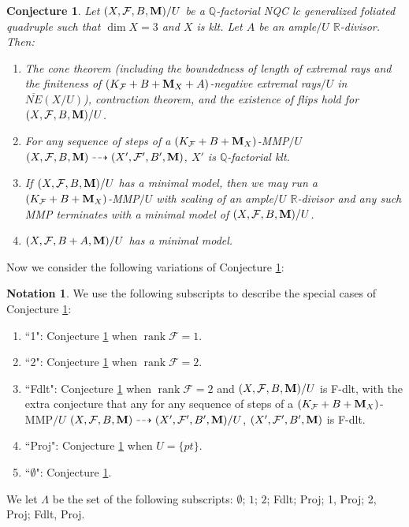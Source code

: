 \documentclass[11pt]{amsart}
\numberwithin{equation}{section}
\newcommand{\Mm}{{\bf{M}}}
\newcommand{\Qq}{\mathbb{Q}}
\newcommand{\Rr}{\mathbb{R}}
\newcommand{\rk}{\operatorname{rank}}
\newcommand{\Ff}{\mathcal{F}}
\newtheorem{conj}[thm]{Conjecture}
\theoremstyle{definition}
\theoremstyle{definition}
\newtheorem{nota}[thm]{Notation}
\theoremstyle{definition}
\begin{document}
\begin{conj}\label{conj: mmp gfq threefold}
    Let $(X,\Ff,B,\Mm)/U$ be a $\Qq$-factorial NQC lc generalized foliated quadruple such that $\dim X=3$ and $X$ is klt. Let $A$ be an ample$/U$ $\Rr$-divisor. Then:
    \begin{enumerate}
    \item The cone theorem (including the boundedness of length of extremal rays and the finiteness of $(K_{\Ff}+B+\Mm_X+A)$-negative extremal rays$/U$ in $\overline{NE}(X/U)$), contraction theorem, and the existence of flips hold for $(X,\Ff,B,\Mm)/U$.
        \item For any sequence of steps of a $(K_{\Ff}+B+\Mm_X)$-MMP$/U$ $(X,\Ff,B,\Mm)\dashrightarrow (X',\Ff',B',\Mm)$, $X'$ is $\Qq$-factorial klt. 
        \item If $(X,\Ff,B,\Mm)/U$ has a minimal model, then we may run a $(K_{\Ff}+B+\Mm_X)$-MMP$/U$ with scaling of an ample$/U$ $\Rr$-divisor and any such MMP terminates with a minimal model of $(X,\Ff,B,\Mm)/U$.
        \item $(X,\Ff,B+A,\Mm)/U$ has a minimal model.
    \end{enumerate}
\end{conj}

Now we consider the following variations of Conjecture \ref{conj: mmp gfq threefold}:

\begin{nota}\label{nota: special conjecture}
    We use the following subscripts to describe the special cases of Conjecture \ref{conj: mmp gfq threefold}:
    \begin{enumerate}
        \item ``1": Conjecture \ref{conj: mmp gfq threefold} when $\rk\Ff=1$.
        \item ``2": Conjecture \ref{conj: mmp gfq threefold} when $\rk\Ff=2$.
        \item ``Fdlt": Conjecture \ref{conj: mmp gfq threefold} when $\rk\Ff=2$ and $(X,\Ff,B,\Mm)/U$ is F-dlt, with the extra conjecture that any for any sequence of steps of a $(K_{\Ff}+B+\Mm_X)$-MMP$/U$ $(X,\Ff,B,\Mm)\dashrightarrow (X',\Ff',B',\Mm)/U$, $(X',\Ff',B',\Mm)$ is F-dlt.
        \item ``Proj": Conjecture \ref{conj: mmp gfq threefold} when $U=\{pt\}$.
        \item ``$\emptyset$": Conjecture \ref{conj: mmp gfq threefold}.
    \end{enumerate}
    We let $\Lambda$ be the set of the following subscripts: $\emptyset$; $1$; $2$; Fdlt; Proj; 1, Proj; 2, Proj; Fdlt, Proj.
\end{nota}
\end{document}
